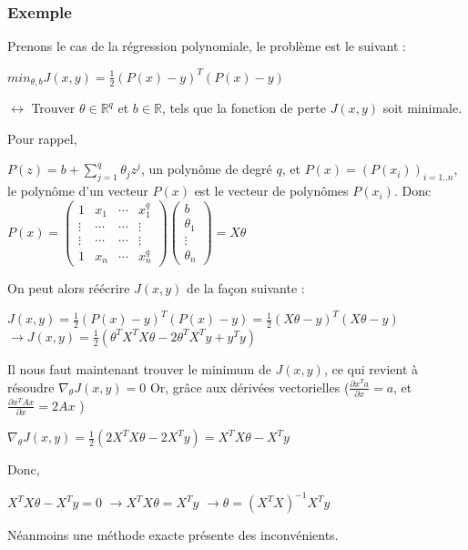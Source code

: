 \documentclass[a4paper, 10pt]{report}
\begin{document}
\subsubsection{Exemple}
Prenons le cas de la régression polynomiale, le problème est le suivant :
\begin{center}
	$min_{\theta,b} J(x,y) = \frac{1}{2} (P(x)-y)^T(P(x)-y)$
	
	$\leftrightarrow$ Trouver $\theta \in \mathbb{R}^q$ et $b \in \mathbb{R}$, tels que la fonction de perte $J(x,y)$ soit minimale.
\end{center}
Pour rappel, 
\begin{center}
	$P(z) = b + \sum_{j=1}^{q}{\theta_j z^j}$,
		un polynôme de degré $q$,
		et $P(x) = (P(x_i))_{i=1..n}$,
		le polynôme d'un vecteur $P(x)$ est le vecteur de polynômes $P(x_i)$.
		Donc $P(x) = 
	\begin{pmatrix}
		1      & x_1    & \cdots & x_1^q  \\
		\vdots & \cdots & \cdots & \vdots \\
		\vdots & \cdots & \cdots & \vdots \\
		1      & x_n    & \cdots & x_n^q  
	\end{pmatrix} 
	\begin{pmatrix}
		b        \\
		\theta_1 \\
		\vdots   \\
		\theta_n 
	\end{pmatrix}
	= X \theta
	$
\end{center}
On peut alors réécrire $J(x,y)$ de la façon suivante :
\begin{center}
	$J(x,y) = \frac{1}{2} (P(x)-y)^T(P(x)-y) = \frac{1}{2} (X\theta-y)^T(X\theta-y)$
		$\rightarrow J(x,y) =\frac{1}{2} (\theta^TX^TX\theta - 2\theta^TX^Ty + y^Ty)$
\end{center}
Il nous faut maintenant trouver le minimum de $J(x,y)$, ce qui revient à résoudre $\nabla_\theta J(x,y) = 0$
Or, grâce aux dérivées vectorielles ($\frac{\partial x^Ta}{\partial x} = a$, et $\frac{\partial x^TAx}{\partial x} = 2Ax$ )
\begin{center}
	$\nabla_\theta J(x,y) = \frac{1}{2} (2X^TX\theta-2X^Ty) = X^TX\theta-X^Ty$
\end{center}
Donc,
\begin{center}
	$X^TX\theta-X^Ty = 0$
		$\rightarrow X^TX\theta = X^Ty$
		$\rightarrow \theta = (X^TX)^{-1} X^Ty$
\end{center}
Néanmoins une méthode exacte présente des inconvénients.
\end{document}
